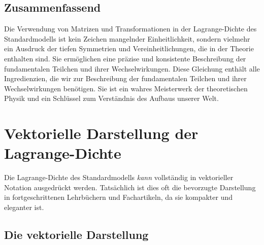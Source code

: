 \documentclass{article}
\begin{document}
	\subsection{Zusammenfassend}
	
	Die Verwendung von Matrizen und Transformationen in der Lagrange-Dichte des Standardmodells ist kein Zeichen mangelnder Einheitlichkeit, sondern vielmehr ein Ausdruck der tiefen Symmetrien und Vereinheitlichungen, die in der Theorie enthalten sind. Sie ermöglichen eine präzise und konsistente Beschreibung der fundamentalen Teilchen und ihrer Wechselwirkungen.
	Diese Gleichung enthält alle Ingredienzien, die wir zur Beschreibung der fundamentalen Teilchen und ihrer Wechselwirkungen benötigen. Sie ist ein wahres Meisterwerk der theoretischen Physik und ein Schlüssel zum Verständnis des Aufbaus unserer Welt.
	
	\section{Vektorielle Darstellung der Lagrange-Dichte}
	
	Die Lagrange-Dichte des Standardmodells \textit{kann} vollständig in vektorieller Notation ausgedrückt werden. Tatsächlich ist dies oft die bevorzugte Darstellung in fortgeschrittenen Lehrbüchern und Fachartikeln, da sie kompakter und eleganter ist.
	
	\subsection{Die vektorielle Darstellung}
	
\end{document}
